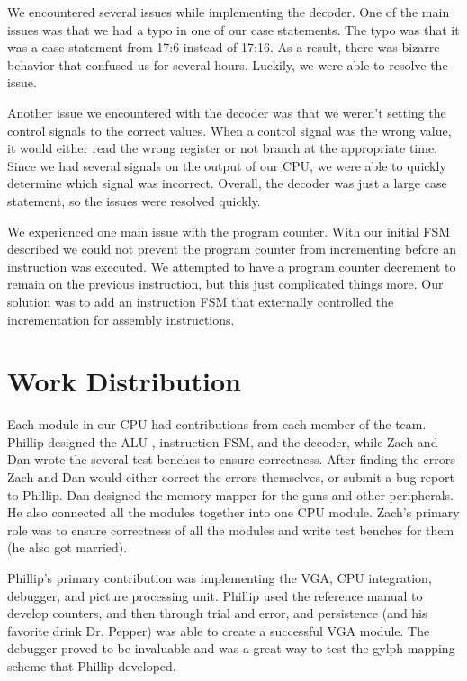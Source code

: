 \documentclass[letterpaper, 11 pt, conference]{article}
\begin{document}
We encountered several issues while implementing the decoder. One of the main issues was that we had a typo in one of our case statements. The typo was that it was a case statement from 17:6 instead of 17:16. As a result, there was bizarre behavior that confused us for several hours. Luckily, we were able to resolve the issue. 

Another issue we encountered with the decoder was that we weren’t setting the control signals to the correct values. When a control signal was the wrong value, it would either read the wrong register or not branch at the appropriate time. Since we had several signals on the output of our CPU, we were able to quickly determine which signal was incorrect. Overall, the decoder was just a large case statement, so the issues were resolved quickly.

We experienced one main issue with the program counter. With our initial FSM described  we could not prevent the program counter from incrementing before an instruction was executed. We attempted to have a program counter decrement to remain on the previous instruction, but this just complicated things more. Our solution was to add an instruction FSM that externally controlled the incrementation for assembly instructions. 

\section{Work Distribution}

Each module in our CPU had contributions from each member of the team. Phillip designed the ALU , instruction FSM, and the decoder, while Zach and Dan wrote the several test benches to ensure correctness. After finding the errors Zach and Dan would either correct the errors themselves, or submit a bug report to Phillip. Dan designed the memory mapper for the guns and other peripherals. He also connected all the modules together into one CPU module. Zach’s primary role was to ensure correctness of all the modules and write test benches for them (he also got married). 

Phillip's primary contribution was implementing the VGA, CPU integration, debugger, and picture processing unit. Phillip used the reference manual to develop counters, and then through trial and error, and persistence (and his favorite drink Dr. Pepper) was able to create a successful VGA module. The debugger proved to be invaluable and was a great way to test the gylph mapping scheme that Phillip developed.
\end{document}
